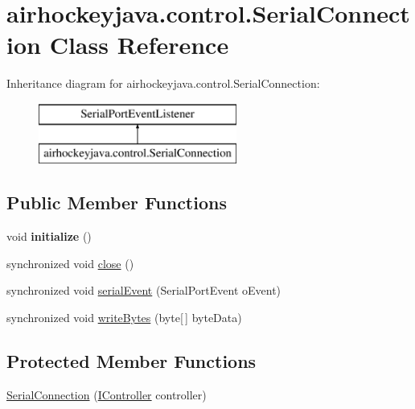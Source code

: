\hypertarget{classairhockeyjava_1_1control_1_1_serial_connection}{}\section{airhockeyjava.\+control.\+Serial\+Connection Class Reference}
\label{classairhockeyjava_1_1control_1_1_serial_connection}
Inheritance diagram for airhockeyjava.\+control.\+Serial\+Connection\+:\begin{figure}[H]
\begin{center}
\leavevmode
\includegraphics[height=2.000000cm]{classairhockeyjava_1_1control_1_1_serial_connection}
\end{center}
\end{figure}
\subsection*{Public Member Functions}
\begin{DoxyCompactItemize}
\item 
\hypertarget{classairhockeyjava_1_1control_1_1_serial_connection_ac06ea5654cb29fdb2ff03b2649ce9c83}{}void {\bfseries initialize} ()\label{classairhockeyjava_1_1control_1_1_serial_connection_ac06ea5654cb29fdb2ff03b2649ce9c83}

\item 
synchronized void \hyperlink{classairhockeyjava_1_1control_1_1_serial_connection_a8ed691876774f9b87e24c76be8f32faf}{close} ()
\item 
synchronized void \hyperlink{classairhockeyjava_1_1control_1_1_serial_connection_af6aa17bf9771efb1f3f3463f14ea31f8}{serial\+Event} (Serial\+Port\+Event o\+Event)
\item 
synchronized void \hyperlink{classairhockeyjava_1_1control_1_1_serial_connection_ab7cac3b03e909f0dc92e98c5df64b8f5}{write\+Bytes} (byte\mbox{[}$\,$\mbox{]} byte\+Data)
\end{DoxyCompactItemize}
\subsection*{Protected Member Functions}
\begin{DoxyCompactItemize}
\item 
\hyperlink{classairhockeyjava_1_1control_1_1_serial_connection_a12da525c30de38fcfde874813e1037c4}{Serial\+Connection} (\hyperlink{interfaceairhockeyjava_1_1control_1_1_i_controller}{I\+Controller} controller)
\end{DoxyCompactItemize}


